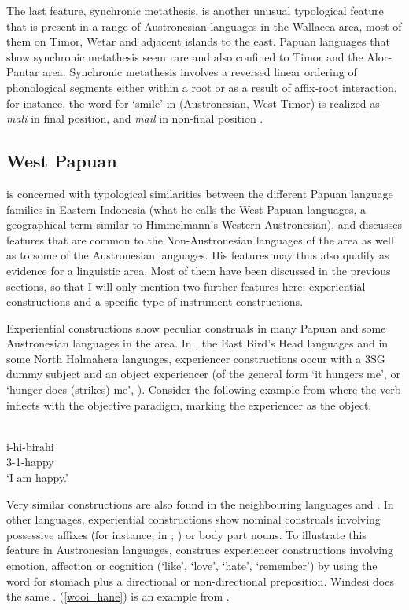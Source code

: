 The last feature, synchronic metathesis, is another unusual typological feature that is present in a range of Austronesian languages in the Wallacea area, most of them on Timor, Wetar and adjacent islands to the east. Papuan languages that show synchronic metathesis seem rare and also confined to Timor and the Alor-Pantar area. Synchronic metathesis involves a reversed linear ordering of phonological segments either within a root or as a result of affix-root interaction, for instance, the word for `smile' in  (Austronesian, West Timor) is realized as \textit{mali} in final position, and \textit{mail} in non-final position \citep[134ff.]{schapper2015wallacea}.

\subsection{West Papuan}\label{sec:westpapuan}

\citet{reesink2005west} is concerned with typological similarities between the different Papuan language families in Eastern Indonesia (what he calls the West Papuan languages, a geographical term similar to Himmelmann's Western Austronesian), and discusses features that are common to the Non-Austronesian languages of the area as well as to some of the Austronesian languages. His features may thus also qualify as evidence for a linguistic area. Most of them have been discussed in the previous sections, so that I will only mention two further features here: experiential constructions and a specific type of instrument constructions. 

Experiential constructions show peculiar construals in many Papuan and some Austronesian languages in the area. In , the East Bird's Head languages and in some North Halmahera languages, experiencer constructions occur with a 3SG dummy subject and an object experiencer  (of the general form `it hungers me', or `hunger does (strikes) me', \citealt[191]{reesink2005west}). Consider the following example from  where the verb inflects with the objective paradigm, marking the experiencer as the object.

\ea 
{}\\
\gll i-hi-birahi \\
3-1-happy \\
\glft `I am happy.'\\ 
\z

Very similar constructions are also found in the neighbouring languages  and . In other languages, experiential constructions show nominal construals involving possessive affixes (for instance, in ; \citealt[192]{reesink2005west}) or body part nouns. To illustrate this feature in Austronesian languages,  construes experiencer constructions involving emotion, affection or cognition (`like', `love', `hate', `remember') by using the word for stomach plus a directional or non-directional preposition. Windesi  does the same \citep[154]{gasser2014windesi}. (\ref{wooi_hane}) is an example from .

